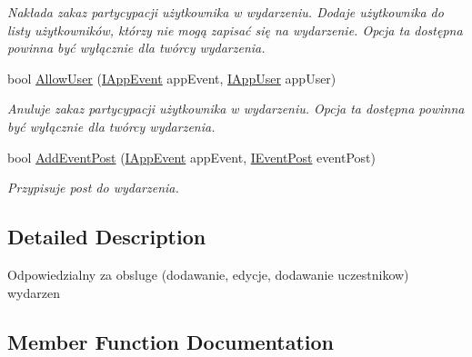 \begin{DoxyCompactItemize}
\begin{DoxyCompactList}\small\item\em Nakłada zakaz partycypacji użytkownika w wydarzeniu. Dodaje użytkownika do listy użytkowników, którzy nie mogą zapisać się na wydarzenie. Opcja ta dostępna powinna być wyłącznie dla twórcy wydarzenia. \end{DoxyCompactList}\item 
bool \hyperlink{class_bibabook_1_1_implementation_1_1_app_event_service_1_1_events_service_ae1ace711340dc8ddda7a94a8740d3bda}{Allow\+User} (\hyperlink{interface_contract_1_1_i_app_event}{I\+App\+Event} app\+Event, \hyperlink{interface_contract_1_1_i_app_user}{I\+App\+User} app\+User)
\begin{DoxyCompactList}\small\item\em Anuluje zakaz partycypacji użytkownika w wydarzeniu. Opcja ta dostępna powinna być wyłącznie dla twórcy wydarzenia. \end{DoxyCompactList}\item 
bool \hyperlink{class_bibabook_1_1_implementation_1_1_app_event_service_1_1_events_service_a8c3fe9b4bbbc6185ef233b43f568a750}{Add\+Event\+Post} (\hyperlink{interface_contract_1_1_i_app_event}{I\+App\+Event} app\+Event, \hyperlink{interface_contract_1_1_i_event_post}{I\+Event\+Post} event\+Post)
\begin{DoxyCompactList}\small\item\em Przypisuje post do wydarzenia. \end{DoxyCompactList}\end{DoxyCompactItemize}


\subsection{Detailed Description}
Odpowiedzialny za obsluge (dodawanie, edycje, dodawanie uczestnikow) wydarzen 



\subsection{Member Function Documentation}
\hypertarget{class_bibabook_1_1_implementation_1_1_app_event_service_1_1_events_service_a8c3fe9b4bbbc6185ef233b43f568a750}{}
